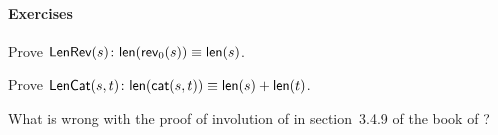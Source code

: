 \paragraph{Exercises}

\begin{enumerate*}

  \item Prove \(\textsf{LenRev}({s}) \colon \textsf{len}(\textsf{rev}_0(s)) \equiv
  \textsf{len}(s)\).

  \item Prove \(\textsf{LenCat}({s,t}) \colon \textsf{len}(\textsf{cat}(s,t)) \equiv
  \textsf{len}(s) + \textsf{len}(t)\).

  \item What is wrong with the proof of involution of
   in section~3.4.9 of the book of
  \cite{CousineauMauny_1998}?

\end{enumerate*}
